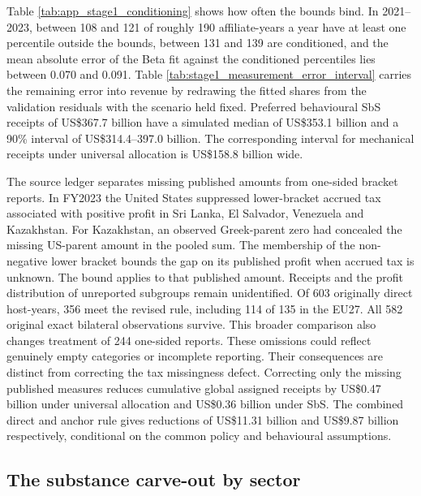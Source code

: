 \documentclass[11pt,a4paper]{article}
\newcommand{\usd}{US\$}
\begin{document}




Table \ref{tab:app_stage1_conditioning} shows how often the bounds bind. In 2021–2023, between 108 and 121 of roughly 190 affiliate-years a year have at least one percentile outside the bounds, between 131 and 139 are conditioned, and the mean absolute error of the Beta fit against the conditioned percentiles lies between 0.070 and 0.091. Table \ref{tab:stage1_measurement_error_interval} carries the remaining error into revenue by redrawing the fitted shares from the validation residuals with the scenario held fixed. Preferred behavioural SbS receipts of \usd367.7 billion have a simulated median of \usd353.1 billion and a 90\% interval of \usd314.4–397.0 billion. The corresponding interval for mechanical receipts under universal allocation is \usd158.8 billion wide.



The source ledger separates missing published amounts from one-sided bracket reports. In FY2023 the United States suppressed lower-bracket accrued tax associated with positive profit in Sri Lanka, El Salvador, Venezuela and Kazakhstan. For Kazakhstan, an observed Greek-parent zero had concealed the missing US-parent amount in the pooled sum. The membership of the non-negative lower bracket bounds the gap on its published profit when accrued tax is unknown. The bound applies to that published amount. Receipts and the profit distribution of unreported subgroups remain unidentified. Of 603 originally direct host-years, 356 meet the revised rule, including 114 of 135 in the EU27. All 582 original exact bilateral observations survive. This broader comparison also changes treatment of 244 one-sided reports. These omissions could reflect genuinely empty categories or incomplete reporting. Their consequences are distinct from correcting the tax missingness defect. Correcting only the missing published measures reduces cumulative global assigned receipts by \usd0.47 billion under universal allocation and \usd0.36 billion under SbS. The combined direct and anchor rule gives reductions of \usd11.31 billion and \usd9.87 billion respectively, conditional on the common policy and behavioural assumptions.

\subsection{The substance carve-out by sector}\label{app:stage2_detail}
\end{document}
